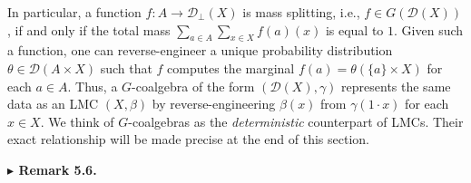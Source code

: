 \hypertarget{html:S5.SS0.SSS0.Px1.p4}{} In particular, a function %
\hypertarget{html:S5.SS0.SSS0.Px1.p4.m1}{}\({f\colon A\to{\mathcal{D}}_{\bot}(X)}\) is mass splitting, i.e., %
\hypertarget{html:S5.SS0.SSS0.Px1.p4.m2}{}\({f\in G({\mathcal{D}}(X))}\), if and only if the total mass %
\hypertarget{html:S5.SS0.SSS0.Px1.p4.m3}{}\({\sum_{a\in A}\sum_{x\in X}f(a)(x)}\) is equal to %
\hypertarget{html:S5.SS0.SSS0.Px1.p4.m4}{}\({1}\). Given such a function, one can reverse-engineer a unique probability distribution %
\hypertarget{html:S5.SS0.SSS0.Px1.p4.m5}{}\({\theta\in{\mathcal{D}}(A\times X)}\) such that %
\hypertarget{html:S5.SS0.SSS0.Px1.p4.m6}{}\({f}\) computes the marginal %
\hypertarget{html:S5.SS0.SSS0.Px1.p4.m7}{}\({f(a)=\theta(\{a\}\times X)}\) for each %
\hypertarget{html:S5.SS0.SSS0.Px1.p4.m8}{}\({a\in A}\). Thus, a %
\hypertarget{html:S5.SS0.SSS0.Px1.p4.m9}{}\({G}\)-coalgebra of the form %
\hypertarget{html:S5.SS0.SSS0.Px1.p4.m10}{}\({({\mathcal{D}}(X),\gamma)}\) represents the same data as an LMC %
\hypertarget{html:S5.SS0.SSS0.Px1.p4.m11}{}\({(X,\beta)}\) by reverse-engineering %
\hypertarget{html:S5.SS0.SSS0.Px1.p4.m12}{}\({\beta(x)}\) from %
\hypertarget{html:S5.SS0.SSS0.Px1.p4.m13}{}\({\gamma(1\cdot x)}\) for each %
\hypertarget{html:S5.SS0.SSS0.Px1.p4.m14}{}\({x\in X}\). We think of %
\hypertarget{html:S5.SS0.SSS0.Px1.p4.m15}{}\({G}\)-coalgebras as the \emph{deterministic} counterpart of LMCs. Their exact relationship will be made precise at the end of this section.
\par\medskip
\hypertarget{html:S5.Thmtheorem6}{} \par\noindent\textbf{%
\hypertarget{html:S5.Thmtheorem6.m1}{}\({\blacktriangleright}\) Remark 5.6.}\quad  %
